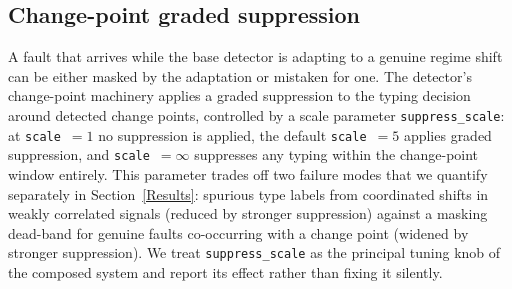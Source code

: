 \subsection{Change-point graded suppression}
A fault that arrives while the base detector is adapting to a genuine regime shift can be either masked by the adaptation or mistaken for one. The detector's change-point machinery applies a graded suppression to the typing decision around detected change points, controlled by a scale parameter \texttt{suppress\_scale}: at \texttt{scale}~$=1$ no suppression is applied, the default \texttt{scale}~$=5$ applies graded suppression, and \texttt{scale}~$=\infty$ suppresses any typing within the change-point window entirely. This parameter trades off two failure modes that we quantify separately in Section~\ref{Results}: spurious type labels from coordinated shifts in weakly correlated signals (reduced by stronger suppression) against a masking dead-band for genuine faults co-occurring with a change point (widened by stronger suppression). We treat \texttt{suppress\_scale} as the principal tuning knob of the composed system and report its effect rather than fixing it silently.

